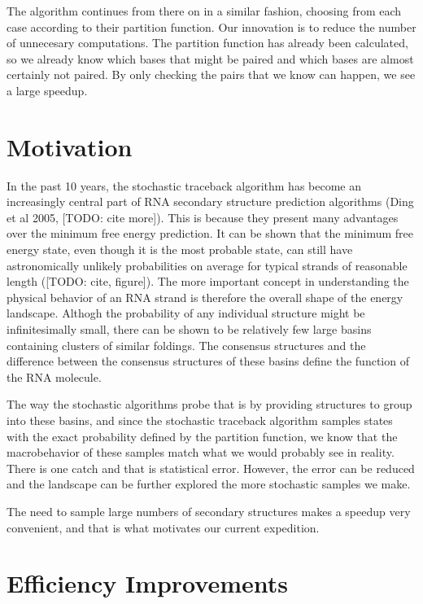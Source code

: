 The algorithm continues from there on in a similar fashion, choosing
from each case according to their partition function. Our innovation
is to reduce the number of unnecesary computations. The partition
function has already been calculated, so we already know which bases
that might be paired and which bases are almost certainly not
paired. By only checking the pairs that we know can happen, we see a
large speedup.

\section{Motivation}

In the past 10 years, the stochastic traceback algorithm has become an
increasingly central part of RNA secondary structure prediction
algorithms (Ding et al 2005, [TODO: cite more]). This is because they
present many advantages over the minimum free energy prediction. It
can be shown that the minimum free energy state, even though it is the
most probable state, can still have astronomically unlikely
probabilities on average for typical strands of reasonable length
([TODO: cite, figure]). The more important concept in understanding
the physical behavior of an RNA strand is therefore the overall shape
of the energy landscape. Althogh the probability of any individual
structure might be infinitesimally small, there can be shown to be
relatively few large basins containing clusters of similar foldings.
The consensus structures and the difference between the consensus
structures of these basins define the function of the RNA molecule.

The way the stochastic algorithms probe that is by providing
structures to group into these basins, and since the stochastic
traceback algorithm samples states with the exact probability defined
by the partition function, we know that the macrobehavior of these
samples match what we would probably see in reality. There is one
catch and that is statistical error. However, the error can be reduced
and the landscape can be further explored the more stochastic samples
we make.

The need to sample large numbers of secondary structures makes a
speedup very convenient, and that is what motivates our current
expedition.

\section{Efficiency Improvements}

